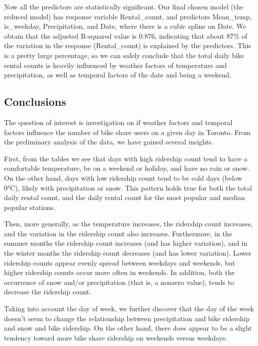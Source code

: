 \documentclass[
]{article}
\begin{document}
Now all the predictors are statistically significant. Our final chosen
model (the reduced model) has response variable Rental\_count, and
predictors Mean\_temp, is\_weekday, Precipitation, and Date, where there
is a cubic spline on Date. We obtain that the adjusted R-squared value
is 0.876, indicating that about 87\% of the variation in the response
(Rental\_count) is explained by the predictors. This is a pretty large
percentage, so we can safely conclude that the total daily bike rental
counts is heavily influenced by weather factors of temperature and
precipitation, as well as temporal factors of the date and being a
weekend.

\hypertarget{conclusions}{%
\subsection{Conclusions}\label{conclusions}}

The question of interest is investigation on if weather factors and
temporal factors influence the number of bike share users on a given day
in Toronto. From the preliminary analysis of the data, we have gained
several insights.

First, from the tables we see that days with high ridership count tend
to have a comfortable temperature, be on a weekend or holiday, and have
no rain or snow. On the other hand, days with low ridership count tend
to be cold days (below 0°C), likely with precipitation or snow. This
pattern holds true for both the total daily rental count, and the daily
rental count for the most popular and median popular stations.

Then, more generally, as the temperature increases, the ridership count
increases, and the variation in the ridership count also increases.
Furthermore, in the summer months the ridership count increases (and has
higher variation), and in the winter months the ridership count
decreases (and has lower variation). Lower ridership counts appear
evenly spread between weekdays and weekends, but higher ridership counts
occur more often in weekends. In addition, both the occurrence of snow
and/or precipitation (that is, a nonzero value), tends to decrease the
ridership count.

Taking into account the day of week, we further discover that the day of
the week doesn't seem to change the relationship between precipitation
and bike ridership and snow and bike ridership. On the other hand, there
does appear to be a slight tendency toward more bike share ridership on
weekends versus weekdays.
\end{document}

